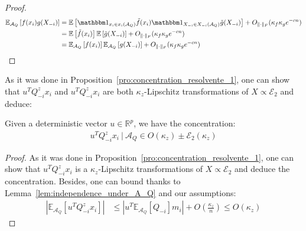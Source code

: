 \documentclass[a4papaer, titlepage]{book}
\begin{document}
\begin{proof}
  \begin{align*}
    \mathbb E_{\mathcal A_Q} \left[  f(x_i) g(X_{-i})\right] 
      &= \mathbb E \left[ \un_{x_i \in x_i(\mathcal A_Q)} \tilde f(x_i) \un_{X_{-i} \in X_{-i}(\mathcal A_Q)}\tilde g(X_{-i}) \right] + O_{\|\cdot \|_F}( \kappa_f \kappa_g e^{-cn})\\
      & = \mathbb E \left[   \tilde f(x_i) \right]\mathbb E \left[ \tilde g(X_{-i}) \right] + O_{\|\cdot \|_F}( \kappa_f \kappa_g e^{-cn})\\
      &= \mathbb E_{\mathcal A_Q} \left[   f(x_i) \right]\mathbb E_{\mathcal A_Q} \left[  g(X_{-i}) \right] + O_{\|\cdot \|_F}( \kappa_f \kappa_g e^{-cn})
    \end{align*}
\end{proof}
 As it was done in Proposition~\ref{pro:concentration_resolvente_1}, one can show that $u^TQ_{-i}^zx_i$ and $u^TQ_{-i}^zx_i$ are both $\kappa_z$-Lipschitz transformations of $X \propto \mathcal E_2$ and deduce:
\begin{lemma}\label{lem:concentration_xQu}
  Given a deterministic vector $u \in \mathbb R^p$, we have the concentration:
  \begin{align*}
    u^TQ_{-i}^zx_i \ | \ \mathcal A_Q \in O(\kappa_z) \pm \mathcal E_2(\kappa_z)
  \end{align*}
\end{lemma} 
\begin{proof}
  As it was done in Proposition~\ref{pro:concentration_resolvente_1}, one can show that $u^TQ_{-i}^zx_i$ is a $\kappa_z$-Lipschitz transformations of $X \propto \mathcal E_2$ and deduce the concentration.
  Besides, one can bound thanks to Lemma~\ref{lem:independence_under_A_Q} and our assumptions:
  \begin{align*}
    \left\vert \mathbb E_{\mathcal A_Q}[u^TQ_{-i}^zx_i ] \right\vert 
    &\leq \left\vert u^T \mathbb E_{\mathcal A_Q}[Q_{-i}]m_i \right\vert + O \left( \frac{\kappa_z}{n} \right) \leq O(\kappa_z)
  \end{align*}
\end{proof}
\end{document}
